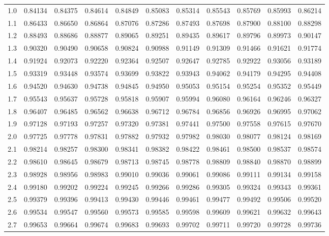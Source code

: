 \documentclass{article}
\begin{document}
\begin{center}
\begin{tabularx}{\linewidth}{*{11}{Y}}
1.0 & 0.84134 & 0.84375 & 0.84614 & 0.84849 & 0.85083 & 0.85314 & 0.85543 & 0.85769 & 0.85993 & 0.86214\\
1.1 & 0.86433 & 0.86650 & 0.86864 & 0.87076 & 0.87286 & 0.87493 & 0.87698 & 0.87900 & 0.88100 & 0.88298\\
1.2 & 0.88493 & 0.88686 & 0.88877 & 0.89065 & 0.89251 & 0.89435 & 0.89617 & 0.89796 & 0.89973 & 0.90147\\
1.3 & 0.90320 & 0.90490 & 0.90658 & 0.90824 & 0.90988 & 0.91149 & 0.91309 & 0.91466 & 0.91621 & 0.91774\\
1.4 & 0.91924 & 0.92073 & 0.92220 & 0.92364 & 0.92507 & 0.92647 & 0.92785 & 0.92922 & 0.93056 & 0.93189\\
1.5 & 0.93319 & 0.93448 & 0.93574 & 0.93699 & 0.93822 & 0.93943 & 0.94062 & 0.94179 & 0.94295 & 0.94408\\
1.6 & 0.94520 & 0.94630 & 0.94738 & 0.94845 & 0.94950 & 0.95053 & 0.95154 & 0.95254 & 0.95352 & 0.95449\\
1.7 & 0.95543 & 0.95637 & 0.95728 & 0.95818 & 0.95907 & 0.95994 & 0.96080 & 0.96164 & 0.96246 & 0.96327\\
1.8 & 0.96407 & 0.96485 & 0.96562 & 0.96638 & 0.96712 & 0.96784 & 0.96856 & 0.96926 & 0.96995 & 0.97062\\
1.9 & 0.97128 & 0.97193 & 0.97257 & 0.97320 & 0.97381 & 0.97441 & 0.97500 & 0.97558 & 0.97615 & 0.97670\\
2.0 & 0.97725 & 0.97778 & 0.97831 & 0.97882 & 0.97932 & 0.97982 & 0.98030 & 0.98077 & 0.98124 & 0.98169\\
2.1 & 0.98214 & 0.98257 & 0.98300 & 0.98341 & 0.98382 & 0.98422 & 0.98461 & 0.98500 & 0.98537 & 0.98574\\
2.2 & 0.98610 & 0.98645 & 0.98679 & 0.98713 & 0.98745 & 0.98778 & 0.98809 & 0.98840 & 0.98870 & 0.98899\\
2.3 & 0.98928 & 0.98956 & 0.98983 & 0.99010 & 0.99036 & 0.99061 & 0.99086 & 0.99111 & 0.99134 & 0.99158\\
2.4 & 0.99180 & 0.99202 & 0.99224 & 0.99245 & 0.99266 & 0.99286 & 0.99305 & 0.99324 & 0.99343 & 0.99361\\
2.5 & 0.99379 & 0.99396 & 0.99413 & 0.99430 & 0.99446 & 0.99461 & 0.99477 & 0.99492 & 0.99506 & 0.99520\\
2.6 & 0.99534 & 0.99547 & 0.99560 & 0.99573 & 0.99585 & 0.99598 & 0.99609 & 0.99621 & 0.99632 & 0.99643\\
2.7 & 0.99653 & 0.99664 & 0.99674 & 0.99683 & 0.99693 & 0.99702 & 0.99711 & 0.99720 & 0.99728 & 0.99736\\

\end{tabularx}
\end{center}
\end{document}
